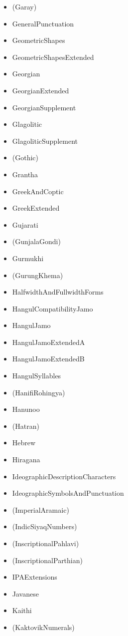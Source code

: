 \documentclass{article}
\newenvironment{itemlist}{%
  \begin{itemize}
  \setlength{\itemsep}{0pt}
  \setlength{\parsep}{0pt}
  \setlength{\topsep}{0pt}
  \setlength{\partopsep}{0pt}
  \setlength{\parskip}{0pt}
  \setlength{\labelsep}{5pt}}%
{
  \end{itemize}}
\begin{document}
\begin{multicols*}{2}
\begin{itemlist}
        \item (Garay)
        \item GeneralPunctuation
        \item GeometricShapes
        \item GeometricShapesExtended
        \item Georgian
        \item GeorgianExtended
        \item GeorgianSupplement
        \item Glagolitic
        \item GlagoliticSupplement
        \item (Gothic)
        \item Grantha
        \item GreekAndCoptic
        \item GreekExtended
        \item Gujarati
        \item (GunjalaGondi)
        \item Gurmukhi
        \item (GurungKhema)
        \item HalfwidthAndFullwidthForms
        \item HangulCompatibilityJamo
        \item HangulJamo
        \item HangulJamoExtendedA
        \item HangulJamoExtendedB
        \item HangulSyllables
        \item (HanifiRohingya)
        \item Hanunoo
        \item (Hatran)
        \item Hebrew
        \item Hiragana
        \item IdeographicDescriptionCharacters
        \item IdeographicSymbolsAndPunctuation
        \item (ImperialAramaic)
        \item (IndicSiyaqNumbers)
        \item (InscriptionalPahlavi)
        \item (InscriptionalParthian)
        \item IPAExtensions
        \item Javanese
        \item Kaithi
        \item (KaktovikNumerals)

\end{itemlist}
\end{multicols*}
\end{document}
